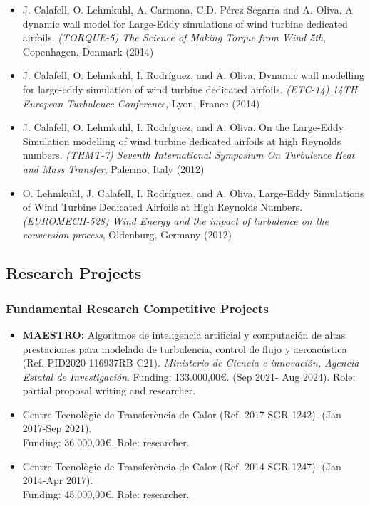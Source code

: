 \documentclass{article}
\begin{document}
\begin{itemize}
\item J. Calafell, O. Lehmkuhl, A. Carmona, C.D. Pérez-Segarra and A. Oliva. A dynamic wall model for Large-Eddy simulations of wind turbine dedicated airfoils. {\it (TORQUE-5) The Science of Making Torque from Wind 5th}, Copenhagen, Denmark (2014)

\item J. Calafell, O. Lehmkuhl, I. Rodríguez, and A. Oliva. Dynamic wall modelling for large-eddy simulation of wind turbine dedicated airfoils. {\it (ETC-14) 14TH European Turbulence Conference}, Lyon, France (2014)

\item J. Calafell, O. Lehmkuhl, I. Rodríguez, and A. Oliva. On the Large-Eddy Simulation modelling of wind turbine dedicated
airfoils at high Reynolds numbers. {\it (THMT-7) Seventh International Symposium On Turbulence Heat and Mass Transfer}, Palermo, Italy (2012)

\item O. Lehmkuhl, J. Calafell, I. Rodríguez, and A. Oliva. Large-Eddy Simulations of Wind Turbine Dedicated Airfoils at High
Reynolds Numbers. {\it (EUROMECH-528) Wind Energy and the impact of turbulence on the conversion process}, Oldenburg, Germany (2012)

\end{itemize}

\subsection{Research Projects}
\subsubsection{Fundamental Research Competitive Projects}

\begin{itemize}

\item {\bf MAESTRO:} Algoritmos de inteligencia artificial y computación de altas prestaciones para modelado de turbulencia, control de flujo y aeroacústica (Ref. PID2020-116937RB-C21). {\it Ministerio de Ciencia e innovación, Agencia Estatal de Investigación}. Funding: 133.000,00€. (Sep 2021- Aug 2024). Role: partial proposal writing and researcher.

\item Centre Tecnològic de Transferència de Calor (Ref. 2017 SGR 1242). (Jan 2017-Sep 2021).\\ Funding: 36.000,00€. Role: researcher.

\item Centre Tecnològic de Transferència de Calor (Ref. 2014 SGR 1247). (Jan 2014-Apr 2017).\\ Funding: 45.000,00€. Role: researcher.

\end{itemize}
\end{document}
